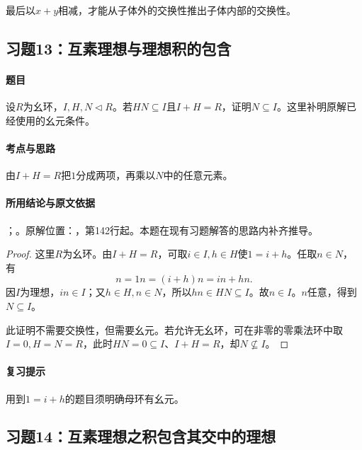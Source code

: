 最后以$x+y$相减，才能从子体外的交换性推出子体内部的交换性。



\subsection{习题13：互素理想与理想积的包含}

\label{ex:3:13}

\paragraph{题目}

设$R$为幺环，$I,H,N\lhd R$。若$HN\subseteq I$且$I+H=R$，证明$N\subseteq I$。这里补明原解已经使用的幺元条件。

\paragraph{考点与思路}

由$I+H=R$把$1$分成两项，再乘以$N$中的任意元素。

\paragraph{所用结论与原文依据}

；。原解位置：，第142行起。本题在现有习题解答的思路内补齐推导。


\begin{proof}

这里$R$为幺环。由$I+H=R$，可取$i\in I,h\in H$使$1=i+h$。任取$n\in N$，有
\[
n=1n=(i+h)n=in+hn.
\]
因$I$为理想，$in\in I$；又$h\in H,n\in N$，所以$hn\in HN\subseteq I$。故$n\in I$。$n$任意，得到$N\subseteq I$。

此证明不需要交换性，但需要幺元。若允许无幺环，可在非零的零乘法环中取$I=0,H=N=R$，此时$HN=0\subseteq I$、$I+H=R$，却$N\nsubseteq I$。

\end{proof}

\paragraph{复习提示}

用到$1=i+h$的题目须明确母环有幺元。



\subsection{习题14：互素理想之积包含其交中的理想}

